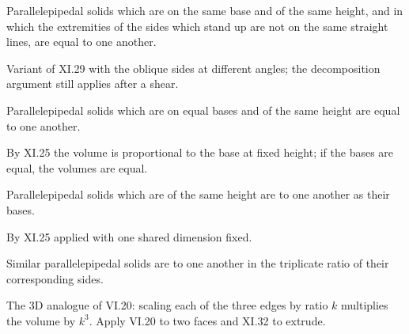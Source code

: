 \begin{claim}
\label{prop:XI.30}
Parallelepipedal solids which are on the same base and of the same
height, and in which the extremities of the sides which stand up are
not on the same straight lines, are equal to one another.
\end{claim}
\begin{evidence}[Proof of XI.30]
\label{ev:XI.30}
Variant of XI.29 with the oblique sides at different angles; the
decomposition argument still applies after a shear.
\end{evidence}

\begin{claim}
\label{prop:XI.31}
Parallelepipedal solids which are on equal bases and of the same
height are equal to one another.
\end{claim}
\begin{evidence}[Proof of XI.31]
\label{ev:XI.31}
By XI.25 the volume is proportional to the base at fixed height; if
the bases are equal, the volumes are equal.
\end{evidence}

\begin{claim}
\label{prop:XI.32}
Parallelepipedal solids which are of the same height are to one
another as their bases.
\end{claim}
\begin{evidence}[Proof of XI.32]
\label{ev:XI.32}
By XI.25 applied with one shared dimension fixed.
\end{evidence}

\begin{claim}
\label{prop:XI.33}
Similar parallelepipedal solids are to one another in the triplicate
ratio of their corresponding sides.
\end{claim}
\begin{evidence}[Proof of XI.33]
\label{ev:XI.33}
The 3D analogue of VI.20: scaling each of the three edges by ratio
$k$ multiplies the volume by $k^3$.  Apply VI.20 to two faces and
XI.32 to extrude.
\end{evidence}

